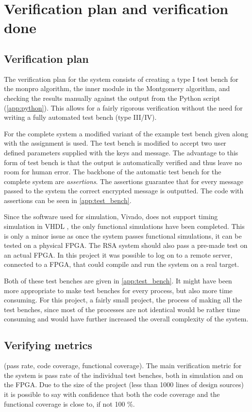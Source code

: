 \section{Verification plan and verification done}
%
\subsection{Verification plan}
The verification plan for the system consists of creating a type I test bench
\cite[p.244]{pedroni} for the monpro algorithm, the inner module in the Montgomery algorithm,
and checking the results manually against the output from the Python script (\cref{app:python}).
This allows for a fairly rigorous verification without the need for writing a fully
automated test bench (type III/IV). 

For the complete system a modified variant of the example test bench given along with the 
assignment is used. The test bench is modified to accept two user defined parameters 
supplied with the keys and message. The advantage to this form of test bench is that
the output is automatically verified and thus leave no room for human error. The backbone
of the automatic test bench for the complete system are \emph{assertions}. The assertions
guarantee that for every message passed to the system the correct encrypted message is outputted.
The code with assertions can be seen in \cref{app:test_bench}.

Since the software used for simulation, Vivado, does not support timing simulation in VHDL
\cite{vivado_timing_sim}, the only functional simulations have been completed. 
This is only a minor issue as once the system passes functional simulations, 
it can be tested on a physical FPGA. The RSA system should also pass a pre-made test on an actual
FPGA. In this project it was possible to log on to a remote server, connected to a FPGA, that could
compile and run the system on a real target. 

Both of these test benches are given in \cref{app:test_bench}. It might have been more
appropriate to make test benches for every process, but also more time consuming. For this
project, a fairly small project, the process of making all the test benches, since most of
the processes are not identical would be rather time consuming and would have further 
increased the overall complexity of the system. 

\subsection{Verifying metrics}
(pass rate, code coverage, functional coverage).
The main verification metric for the system is pass rate of the individual test benches, 
both in simulation and on the FPGA. Due to the size of the project (less than 1000 lines of 
design sources) it is possible to say with confidence that both the code coverage and the 
functional coverage is close to, if not 100 \%. 

